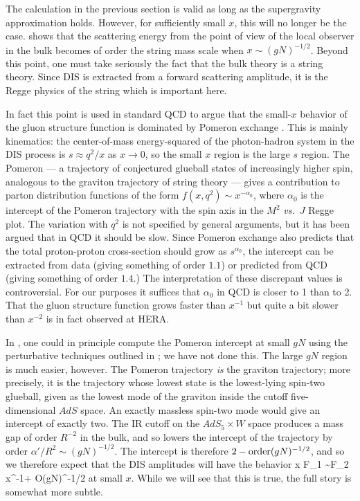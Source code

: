 The calculation in the previous section is valid as long
as the supergravity approximation holds.  However,
for sufficiently small $x$, this will no longer be the
case.   shows that the scattering energy from the
point of view of the local observer in the bulk becomes
of order the string mass scale when $x\sim (gN)^{-1/2}$.
Beyond this point, one must take seriously the fact
that the bulk theory is a string theory.  Since
DIS is extracted from a forward scattering amplitude, it is the
Regge physics of the string which is important here.

In fact this point is used in standard QCD to argue that 
the small-$x$ behavior
of the gluon structure function is dominated by Pomeron
exchange \cite{Abarbanel,FR}.
This is mainly kinematics: the center-of-mass energy-squared
of the photon-hadron system in the DIS process is
$
s  \approx q^2/x
$
as $x\to 0$, so the small $x$ region is the large $s$ region.
The Pomeron --- a trajectory of conjectured glueball states of
increasingly higher spin, analogous to the graviton trajectory
of string theory --- gives a contribution to parton distribution
functions of the form
$f(x,q^2)\sim x^{-\alpha_0}$, where $\alpha_0$ is
the intercept of the Pomeron trajectory with the spin axis in
the $M^2$ {\it vs.}~$J$ Regge plot.  The variation with $q^2$ is
not specified by general arguments,
but it has been argued \cite{Abarbanel} that
in QCD it should be slow.  Since Pomeron exchange also predicts that
the total proton-proton cross-section should grow as $s^{\alpha_0}$,
the intercept can be extracted from data (giving something of order $1.1$)
or predicted from QCD (giving something of order $1.4$.)  The interpretation
of these discrepant values is controversial.
For our purposes it suffices that $\alpha_0$ in QCD is closer
to 1 than  to 2.
That the gluon structure function grows faster than $x^{-1}$
but quite a bit slower than $x^{-2}$ is in fact observed at HERA.

In \nonestar, one could in principle compute the Pomeron
intercept at small $gN$ using the perturbative techniques outlined in
\cite{FR}; we have not done this.  The large $gN$ region is much easier,
however. The Pomeron trajectory {\it is} the graviton trajectory; more
precisely, it is the trajectory whose lowest state is the lowest-lying
spin-two glueball, given as the lowest mode of the graviton inside the
cutoff five-dimensional $AdS$ space. 
An exactly massless spin-two mode would give an intercept of
exactly two. The IR cutoff on the $AdS_5 \times W$ space produces a mass gap of
order $R^{-2}$ in the bulk, and so lowers the 
intercept of the trajectory by order
$\alpha'/R^2 \sim (gN)^{-1/2}$. The intercept 
is therefore $2-{\rm order}(gN)^{-1/2}$, and so
we therefore expect that the DIS amplitudes will
have the behavior
x F_1 \sim F_2 \propto
x^{-1+ O(gN)^{-1/2}}
\ee
at small $x$.  While we will see that this is 
true, the full story is somewhat more subtle.

